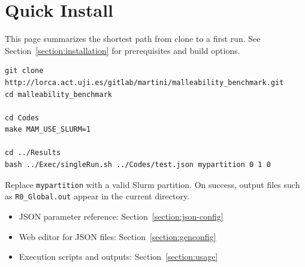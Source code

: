 \section*{Quick Install}

This page summarizes the shortest path from clone to a first run. See Section~\ref{section:installation} for prerequisites and build options.

\begin{lstlisting}[style=bashstyle,caption={Minimal Proteo setup and smoke test.},captionpos=b]
git clone http://lorca.act.uji.es/gitlab/martini/malleability_benchmark.git
cd malleability_benchmark

cd Codes
make MAM_USE_SLURM=1

cd ../Results
bash ../Exec/singleRun.sh ../Codes/test.json mypartition 0 1 0
\end{lstlisting}

Replace \texttt{mypartition} with a valid Slurm partition. On success, output files such as \texttt{R0\_Global.out} appear in the current directory.

\begin{itemize}
  \item JSON parameter reference: Section~\ref{section:json-config}
  \item Web editor for JSON files: Section~\ref{section:genconfig}
  \item Execution scripts and outputs: Section~\ref{section:usage}
\end{itemize}
